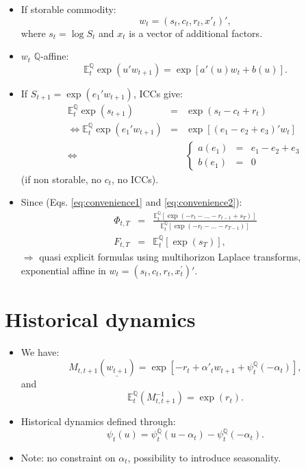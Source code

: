 \documentclass[
  12pt,
]{book}
\providecommand{\tightlist}{%
  \setlength{\itemsep}{0pt}\setlength{\parskip}{0pt}}
\theoremstyle{definition}
\theoremstyle{definition}
\theoremstyle{definition}
\theoremstyle{definition}
\theoremstyle{remark}
\begin{document}
\begin{itemize}
\tightlist
\item
  If storable commodity:
  \[
  w_t = (s_t, c_t, r_t, x'_t)',
  \]
  where \(s_t = \log S_t\) and \(x_t\) is a vector of additional factors.
\item
  \(w_t\) \(\mathbb{Q}\)-affine:
  \[
  \mathbb{E}^{\mathbb{Q}}_t \exp (u' w_{t+1}) = \exp [a' (u) w_t + b(u)].
  \]
\item
  If \(S_{t+1} = \exp (e_1' w_{t+1})\), ICCs give:
  \begin{eqnarray*}
  \mathbb{E}^{\mathbb{Q}}_t \exp (s_{t+1}) &=& \exp (s_t-c_t+r_t)\\
  \Leftrightarrow \mathbb{E}^{\mathbb{Q}}_t \exp (e_1' w_{t+1}) &=& \exp [(e_1 - e_2 + e_3)' w_t]\\
  \Leftrightarrow && \left\{\begin{array}{lcl}
  a(e_1) &=& e_1 - e_2 + e_3 \\
  b(e_1) & =&0
  \end{array} \right.
  \end{eqnarray*}
  (if non storable, no \(c_t\), no ICCs).
\item
  Since (Eqs. \eqref{eq:convenience1} and \eqref{eq:convenience2}):
  \begin{eqnarray*}
  \Phi_{t,T} & = & \frac{\mathbb{E}^{\mathbb{Q}}_t [\exp (-r_t - \ldots - r_{t-1} + s_T)]}{\mathbb{E}^{\mathbb{Q}}_t [\exp (-r_t - \ldots - r_{T-1})]} \\
  F_{t,T} & = & \mathbb{E}^{\mathbb{Q}}_t [\exp (s_T)],
  \end{eqnarray*}
  \(\Rightarrow\) quasi explicit formulas using multihorizon Laplace transforms,
  exponential affine in \(w_t = (s_t, c_t, r_t, x^{'}_t)'\).
\end{itemize}

\hypertarget{historical-dynamics}{%
\section{Historical dynamics}\label{historical-dynamics}}

\begin{itemize}
\item
  We have:
  \[
  M_{t,t+1} (\underline{w_{t+1}}) = \exp [-r_t + \alpha'_t w_{t+1} + \psi^{\mathbb{Q}}_t (-\alpha_t)],
  \]
  and
  \[
  \mathbb{E}^{\mathbb{Q}}_t (M_{t,t+1}^{-1}) = \exp (r_t).
  \]
\item
  Historical dynamics defined through:
  \[
  \psi_t (u) = \psi^{\mathbb{Q}}_t (u-\alpha_t) - \psi^{\mathbb{Q}}_t(-\alpha_t).
  \]
\item
  Note: no constraint on \(\alpha_t\), possibility to introduce seasonality.
\end{itemize}
\end{document}

